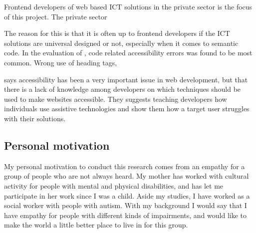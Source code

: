 Frontend developers of web based ICT solutions in the private sector is the focus of this project. The private sector 

The reason for this is that it is often up to frontend developers if the ICT solutions are universal designed or not, especially when it comes to semantic code. In the evaluation of \textcite{difi_digitale_2015}, code related accessibility errors was found to be most common. Wrong use of heading tags, 


\textcite{Freire2008} says accessibility has been a very important issue in web development, but that there is a lack of knowledge among developers on which techniques should be used to make websites accessible. They suggests teaching developers how individuals use assistive technologies and show them how a target user struggles with their solutions.

\subsection{Personal motivation}
My personal motivation to conduct this research comes from an empathy for a group of people who are not always heard. My mother has worked with cultural activity for people with mental and physical disabilities, and has let me participate in her work since I was a child. Aside my studies, I have worked as a social worker with people with autism. With my background I would say that I have empathy for people with different kinds of impairments, and would like to make the world a little better place to live in for this group. 



